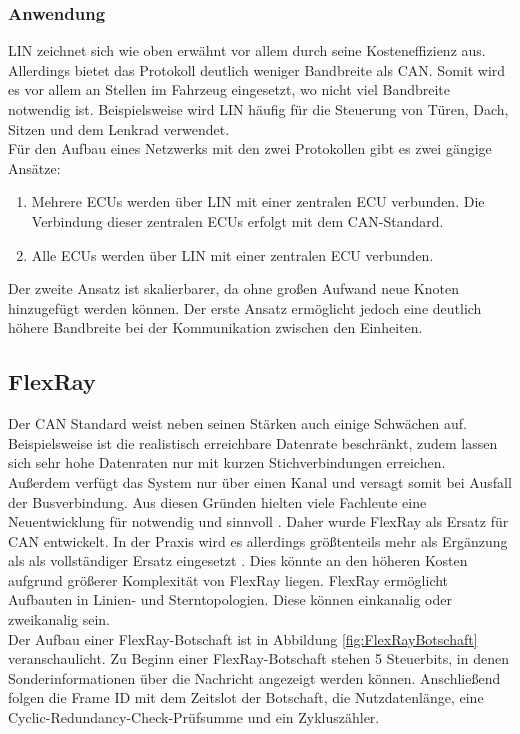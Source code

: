 \subsubsection{Anwendung}
\ac{LIN} zeichnet sich wie oben erwähnt vor allem durch seine Kosteneffizienz aus. Allerdings bietet das Protokoll deutlich weniger Bandbreite als \acs{CAN}. Somit wird es vor allem an Stellen im Fahrzeug eingesetzt, wo nicht viel Bandbreite notwendig ist. Beispielsweise wird \acs{LIN} häufig für die Steuerung von Türen, Dach, Sitzen und dem Lenkrad verwendet. \cite[59]{Fijalkowski.2011} \\
Für den Aufbau eines Netzwerks mit den zwei Protokollen gibt es zwei gängige Ansätze:
\begin{enumerate}
\item Mehrere \acsp{ECU} werden über \acs{LIN} mit einer zentralen \acs{ECU} verbunden. Die Verbindung dieser zentralen \acsp{ECU} erfolgt mit dem \acs{CAN}-Standard.
\item Alle \acsp{ECU} werden über \acs{LIN} mit einer zentralen \acs{ECU} verbunden.
\end{enumerate}
Der zweite Ansatz ist skalierbarer, da ohne großen Aufwand neue Knoten hinzugefügt werden können. Der erste Ansatz ermöglicht jedoch eine deutlich höhere Bandbreite bei der Kommunikation zwischen den Einheiten. \cite[58]{Fijalkowski.2011}


\subsection{FlexRay}
Der \ac{CAN} Standard weist neben seinen Stärken auch einige Schwächen auf. Beispielsweise ist die realistisch erreichbare Datenrate beschränkt, zudem lassen sich sehr hohe Datenraten nur mit kurzen Stichverbindungen erreichen. Außerdem verfügt das System nur über einen Kanal und versagt somit bei Ausfall der Busverbindung. Aus diesen Gründen hielten viele Fachleute eine Neuentwicklung für notwendig und sinnvoll \cite[96]{Zimmermann.2014}. Daher wurde FlexRay als Ersatz für \acs{CAN} entwickelt. In der Praxis wird es allerdings größtenteils mehr als Ergänzung als als vollständiger Ersatz eingesetzt \cite[97]{Zimmermann.2014}. Dies könnte an den höheren Kosten aufgrund größerer Komplexität von FlexRay liegen. FlexRay ermöglicht Aufbauten in Linien- und Sterntopologien. Diese können einkanalig oder zweikanalig sein.\\
Der Aufbau einer FlexRay-Botschaft ist in Abbildung \ref{fig:FlexRayBotschaft} veranschaulicht. Zu Beginn einer FlexRay-Botschaft stehen 5 Steuerbits, in denen Sonderinformationen über die Nachricht angezeigt werden können. Anschließend folgen die Frame ID mit dem Zeitslot der Botschaft, die Nutzdatenlänge, eine Cyclic-Redundancy-Check-Prüfsumme und ein Zykluszähler. 


